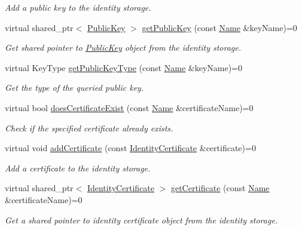 \begin{DoxyCompactItemize}
\begin{DoxyCompactList}\small\item\em Add a public key to the identity storage. \end{DoxyCompactList}\item 
virtual shared\+\_\+ptr$<$ \hyperlink{classndn_1_1PublicKey}{Public\+Key} $>$ \hyperlink{classndn_1_1SecPublicInfo_a5212e6cd18230e8eb46bcefd143f740a}{get\+Public\+Key} (const \hyperlink{classndn_1_1Name}{Name} \&key\+Name)=0
\begin{DoxyCompactList}\small\item\em Get shared pointer to \hyperlink{classndn_1_1PublicKey}{Public\+Key} object from the identity storage. \end{DoxyCompactList}\item 
virtual Key\+Type \hyperlink{classndn_1_1SecPublicInfo_a69c177089c7779f899ac87703f9a0e6f}{get\+Public\+Key\+Type} (const \hyperlink{classndn_1_1Name}{Name} \&key\+Name)=0
\begin{DoxyCompactList}\small\item\em Get the type of the queried public key. \end{DoxyCompactList}\item 
virtual bool \hyperlink{classndn_1_1SecPublicInfo_a03b08df2d96151041d246a79994a8d56}{does\+Certificate\+Exist} (const \hyperlink{classndn_1_1Name}{Name} \&certificate\+Name)=0
\begin{DoxyCompactList}\small\item\em Check if the specified certificate already exists. \end{DoxyCompactList}\item 
virtual void \hyperlink{classndn_1_1SecPublicInfo_a5e9f423d502c2563cc6da283e85c069c}{add\+Certificate} (const \hyperlink{classndn_1_1IdentityCertificate}{Identity\+Certificate} \&certificate)=0
\begin{DoxyCompactList}\small\item\em Add a certificate to the identity storage. \end{DoxyCompactList}\item 
virtual shared\+\_\+ptr$<$ \hyperlink{classndn_1_1IdentityCertificate}{Identity\+Certificate} $>$ \hyperlink{classndn_1_1SecPublicInfo_a3b7b96d3c45c85f2f07af532687190cc}{get\+Certificate} (const \hyperlink{classndn_1_1Name}{Name} \&certificate\+Name)=0
\begin{DoxyCompactList}\small\item\em Get a shared pointer to identity certificate object from the identity storage. \end{DoxyCompactList}\item 

\end{DoxyCompactItemize}
